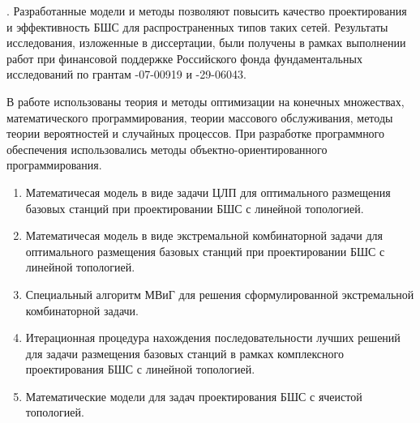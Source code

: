 {\influence}. Разработанные модели и методы позволяют повысить качество проектирования и эффективность БШС для распространенных типов таких сетей. Результаты исследования, изложенные в диссертации, были получены в рамках выполнении работ при финансовой поддержке Российского фонда фундаментальных исследований по грантам -07-00919 и  -29-06043.


{\methods} В работе использованы теория и методы оптимизации на конечных множествах, математического программирования, теории массового обслуживания, методы теории вероятностей и случайных процессов. При разработке программного обеспечения использовались методы объектно-ориентированного программирования.

{}

\begin{enumerate}[beginpenalty=10000] %
    \item Математичесая модель в виде задачи ЦЛП для оптимального размещения базовых станций при проектировании БШС с линейной топологией.
    \item Математичесая модель в виде экстремальной комбинаторной задачи для оптимального размещения базовых станций при проектировании БШС с линейной топологией.
    \item Специальный алгоритм МВиГ для решения сформулированной
    экстремальной комбинаторной задачи.
    \item Итерационная процедура нахождения последовательности лучших
    решений для задачи размещения базовых станций в рамках комплексного
    проектирования БШС с линейной топологией.
    \item Математические модели для задач проектирования БШС с ячеистой
    топологией.
  \end{enumerate}

